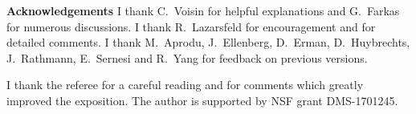 




\textbf{Acknowledgements} I thank C.\ Voisin for helpful explanations and G.\ Farkas for numerous discussions. I thank R.\ Lazarsfeld for encouragement and for detailed comments. I thank M.\ Aprodu, J.\ Ellenberg, D.\ Erman, D.\ Huybrechts, J.\ Rathmann, E.\ Sernesi and R.\ Yang for feedback on previous versions.

I thank the referee for a careful reading and for comments which greatly improved the exposition. The author is supported by NSF grant DMS-1701245.

